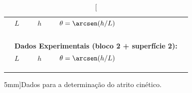 \begin{table}[!ht]
\begin{tabular}{lp{28mm}p{28mm}p{28mm}l}
	\cmidrule{2-4}
	& $L$ & $h$ & $\theta = \arcsen (h/L)$ & \\
	\cmidrule{2-4}
	& \cellcolor[gray]{0.89} & \cellcolor[gray]{0.92} & \cellcolor[gray]{0.89} \\
	& \cellcolor[gray]{0.95} & \cellcolor[gray]{0.97} & \cellcolor[gray]{0.95} \\
	& \cellcolor[gray]{0.89} & \cellcolor[gray]{0.92} & \cellcolor[gray]{0.89} \\	
	\cmidrule{2-4}
    \\
	&\multicolumn{3}{l}{\textbf{Dados Experimentais (bloco 2 + superfície 2):}} \\
	\cmidrule{2-4}
	& $L$ & $h$ & $\theta = \arcsen (h/L)$ & \\
	\cmidrule{2-4}
	& \cellcolor[gray]{0.89} & \cellcolor[gray]{0.92} & \cellcolor[gray]{0.89} \\
	& \cellcolor[gray]{0.95} & \cellcolor[gray]{0.97} & \cellcolor[gray]{0.95} \\
	& \cellcolor[gray]{0.89} & \cellcolor[gray]{0.92} & \cellcolor[gray]{0.89} \\	
	\cmidrule{2-4}

\bottomrule
\end{tabular}
\caption[][5mm]{Dados para a determinação do atrito cinético.}
\label{DadosAtritoEstatico}
\end{table}

\pagebreak

